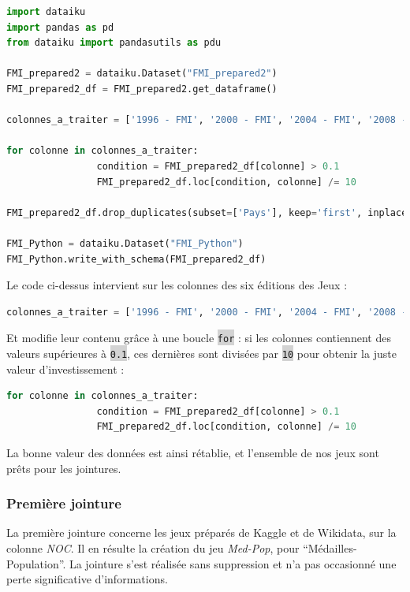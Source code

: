 \documentclass[hidelinks, 12pt]{article}
\newcommand{\code}[1]{\colorbox{LightGray}{\texttt{#1}}}
\begin{document}
\begin{lstlisting}[language=python]
import dataiku
import pandas as pd
from dataiku import pandasutils as pdu

FMI_prepared2 = dataiku.Dataset("FMI_prepared2")
FMI_prepared2_df = FMI_prepared2.get_dataframe()

colonnes_a_traiter = ['1996 - FMI', '2000 - FMI', '2004 - FMI', '2008 - FMI', '2012 - FMI', '2016 - FMI']

for colonne in colonnes_a_traiter:
				condition = FMI_prepared2_df[colonne] > 0.1
				FMI_prepared2_df.loc[condition, colonne] /= 10

FMI_prepared2_df.drop_duplicates(subset=['Pays'], keep='first', inplace=True)

FMI_Python = dataiku.Dataset("FMI_Python")
FMI_Python.write_with_schema(FMI_prepared2_df)
\end{lstlisting}

Le code ci-dessus intervient sur les colonnes des six éditions des Jeux :

\begin{lstlisting}[language=python]	
colonnes_a_traiter = ['1996 - FMI', '2000 - FMI', '2004 - FMI', '2008 - FMI', '2012 - FMI', '2016 - FMI']
\end{lstlisting}

Et modifie leur contenu grâce à une boucle \code{for} : si les colonnes contiennent des valeurs supérieures à \code{0.1}, ces dernières sont divisées par \code{10} pour obtenir la juste valeur d'investissement :

\begin{lstlisting}[language=python]
for colonne in colonnes_a_traiter:
				condition = FMI_prepared2_df[colonne] > 0.1
				FMI_prepared2_df.loc[condition, colonne] /= 10
\end{lstlisting}

La bonne valeur des données est ainsi rétablie, et l'ensemble de nos jeux sont prêts pour les jointures.

\subsubsection{Première jointure}

La première jointure concerne les jeux préparés de Kaggle et de Wikidata, sur la colonne \emph{NOC}. Il en résulte la création du jeu \emph{Med-Pop}, pour \enquote{Médailles-Population}. La jointure s'est réalisée sans suppression et n'a pas occasionné une perte significative d'informations.
\end{document}
